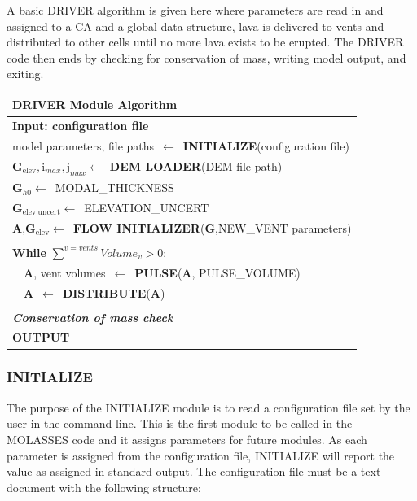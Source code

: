 \documentclass[12pt,letter]{article}
\begin{document}
			A basic DRIVER algorithm is given here where parameters are read in and assigned to a CA and a global data structure, lava is delivered to vents and distributed to other cells until no more lava exists to be erupted. The DRIVER code then ends by checking for conservation of mass, writing model output, and exiting.
			\begin{center}
				\begin{tabular}{l}
					\toprule
					\textbf{DRIVER Module Algorithm}\\
					\midrule
					\textbf{Input: configuration file}\\
					model parameters, file paths~$\leftarrow$~\textbf{INITIALIZE}(configuration file)\\
					\textbf{G}$_{\mathrm{elev}},\mathrm{i}_{max},\mathrm{j}_{max}\leftarrow$~\textbf{DEM LOADER}(DEM file path)\\
					\textbf{G}$_{h0}\leftarrow$~MODAL\_THICKNESS\\
					\textbf{G}$_{\mathrm{elev~uncert}}\leftarrow$~ELEVATION\_UNCERT\\
					\textbf{A},\textbf{G}$_{\mathrm{elev}}\leftarrow$~\textbf{FLOW INITIALIZER}(\textbf{G},NEW\_VENT parameters)\\\\
					
					\textbf{While} $\displaystyle\sum^{v=vents} Volume_{v}>0$:\\
					~~\textbf{A}, vent volumes~$\leftarrow$~\textbf{PULSE}(\textbf{A}, PULSE\_VOLUME)\\
					~~\textbf{A}~$\leftarrow$~\textbf{DISTRIBUTE}(\textbf{A})\\\\
					
					\textbf{\textit{Conservation of mass check}}\\
					\textbf{OUTPUT}\\
					
					\bottomrule
				\end{tabular}
			\end{center}

		
		\subsubsection{INITIALIZE}
			The purpose of the INITIALIZE module is to read a configuration file set by the user in the command line. This is the first module to be called in the MOLASSES code and it assigns parameters for future modules. As each parameter is assigned from the configuration file, INITIALIZE will report the value as assigned in standard output. The configuration file must be a text document with the following structure:
			
\end{document}
